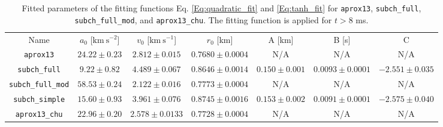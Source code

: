 \documentclass[preprint,times,tighten,linenumbers]{aastex631}
\begin{document}
\begin{table*}
\caption{\label{Tab:network_fitted_param}
Fitted parameters of the fitting functions Eq. \ref{Eq:quadratic_fit} and \ref{Eq:tanh_fit} for {\tt aprox13}, {\tt subch\_full}, {\tt subch\_full\_mod}, and {\tt aprox13\_chu}. The fitting function is applied for $t > 8$ ms.
}

\begin{ruledtabular}
\footnotesize
\centering
\begin{tabular}{ccccccc}
\small 
Name &
$a_0$ [$\mbox{km} \ \mbox{s}^{-2}$] &
$v_0$ [$\mbox{km} \ \mbox{s}^{-1}$] &
$r_0$ [km] &
A [km]&
B [s]&
C

\\ 
\colrule
{\tt aprox13} & $24.22 \pm 0.23$ & $2.812 \pm 0.015$ & $0.7680\pm 0.0004 $ & N/A & N/A & N/A\\

{\tt subch\_full} & $9.22 \pm 0.82$ & $4.489 \pm 0.067$ & $0.8646 \pm 0.0014$ & $0.150 \pm 0.001$ & $0.0093 \pm 0.0001$ & $-2.551 \pm 0.035$ \\

{\tt subch\_full\_mod} & $58.53 \pm 0.24$ & $2.122 \pm 0.016$ & $0.7773 \pm 0.0004$ & N/A & N/A & N/A \\

{\tt subch\_simple} & $15.60 \pm 0.93$ & $3.961 \pm 0.076$ & $0.8745 \pm 0.0016$ & $0.153 \pm 0.002$ & $0.0091 \pm 0.0001$ & $-2.575 \pm 0.040$\\
 
{\tt aprox13\_chu} & $22.96 \pm 0.20$ & $2.578 \pm 0.0133$ & $0.7728 \pm 0.0004$ & N/A & N/A & N/A\\
 


\end{tabular}
\end{ruledtabular}
\end{table*}
\end{document}
